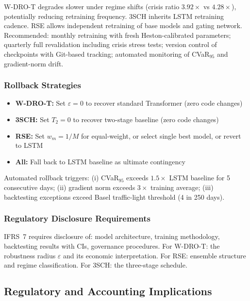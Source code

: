 W-DRO-T degrades slower under regime shifts (crisis ratio $3.92\times$ vs $4.28\times$), potentially reducing retraining frequency. 3SCH inherits LSTM retraining cadence. RSE allows independent retraining of base models and gating network. Recommended: monthly retraining with fresh Heston-calibrated parameters; quarterly full revalidation including crisis stress tests; version control of checkpoints with Git-based tracking; automated monitoring of CVaR$_{95}$ and gradient-norm drift.

\subsubsection{Rollback Strategies}

\begin{itemize}[noitemsep]
    \item \textbf{W-DRO-T:} Set $\varepsilon=0$ to recover standard Transformer (zero code changes)
    \item \textbf{3SCH:} Set $T_2=0$ to recover two-stage baseline (zero code changes)
    \item \textbf{RSE:} Set $w_m = 1/M$ for equal-weight, or select single best model, or revert to LSTM
    \item \textbf{All:} Fall back to LSTM baseline as ultimate contingency
\end{itemize}

Automated rollback triggers: (i) CVaR$_{95}$ exceeds $1.5\times$ LSTM baseline for 5 consecutive days; (ii) gradient norm exceeds $3\times$ training average; (iii) backtesting exceptions exceed Basel traffic-light threshold (4 in 250 days).

\subsubsection{Regulatory Disclosure Requirements}

IFRS~7 requires disclosure of: model architecture, training methodology, backtesting results with CIs, governance procedures. For W-DRO-T: the robustness radius $\varepsilon$ and its economic interpretation. For RSE: ensemble structure and regime classification. For 3SCH: the three-stage schedule.

\subsection{Regulatory and Accounting Implications}
\label{sec:regulatory}

